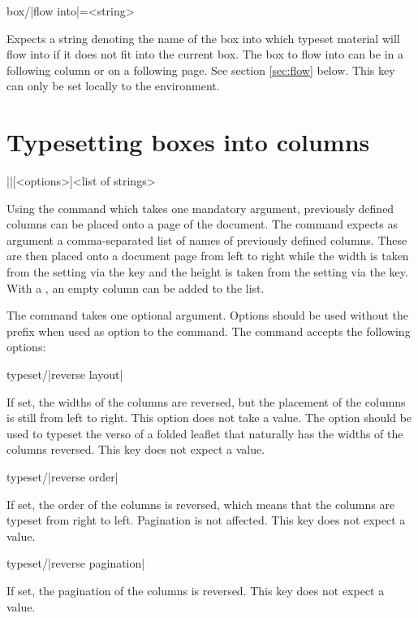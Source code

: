 \documentclass[a4paper]{article}
\begin{document}
\begin{macrodef}
box/|flow into|={<string>}
\end{macrodef}
Expects a string denoting the name of the box into which typeset material will flow into if it does not fit into the current box. The box to flow into can be in a following column or on a following page. See section \ref{sec:flow} below. This key can only be set locally to the  environment.

\section{Typesetting boxes into columns}

\begin{macrodef}
|\leporellotypesetcolumns|[<options>]{<list of strings>}
\end{macrodef}
Using the command \macro{\leporellotypesetcolumns} which takes one mandatory argument, previously defined columns can be placed onto a page of the document. The command expects as argument a comma-separated list of names of previously defined columns. These are then placed onto a document page from left to right while the width is taken from the setting via the  key and the height is taken from the setting via the  key. With a , an empty column can be added to the list.

The command takes one optional argument. Options should be used without the  prefix when used as option to the \macro{\leporellotypesetcolumns} command. The command accepts the following options:

\begin{macrodef}
typeset/|reverse layout|
\end{macrodef}
If set, the widths of the columns are reversed, but the placement of the columns is still from left to right. This option does not take a value. The option should be used to typeset the verso of a folded leaflet that naturally has the widths of the columns reversed. This key does not expect a value.

\begin{macrodef}
typeset/|reverse order|
\end{macrodef}
If set, the order of the columns is reversed, which means that the columns are typeset from right to left. Pagination is not affected. This key does not expect a value.

\begin{macrodef}
typeset/|reverse pagination|
\end{macrodef}
If set, the pagination of the columns is reversed. This key does not expect a value.
\end{document}
